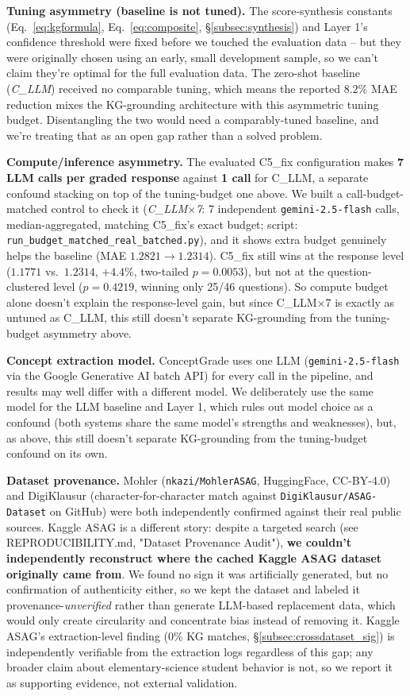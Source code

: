 \documentclass[conference]{IEEEtran}
\begin{document}
\textbf{Tuning asymmetry (baseline is not tuned).} The score-synthesis
constants (Eq.~\eqref{eq:kgformula}, Eq.~\eqref{eq:composite},
\S\ref{subsec:synthesis}) and Layer 1's confidence threshold were
fixed before we touched the evaluation data -- but they were
originally chosen using an early, small development sample, so we
can't claim they're optimal for the full evaluation data. The
zero-shot baseline (\textit{C\_LLM}) received no comparable tuning,
which means the reported $8.2\%$ MAE reduction mixes the KG-grounding
architecture with this asymmetric tuning budget. Disentangling the two
would need a comparably-tuned baseline, and we're treating that as an
open gap rather than a solved problem.

\textbf{Compute/inference asymmetry.} The evaluated C5\_fix
configuration makes \textbf{7 LLM calls per graded response} against
\textbf{1 call} for C\_LLM, a separate confound stacking on top of the
tuning-budget one above. We built a call-budget-matched control to
check it (\textit{C\_LLM$\times$7}: 7 independent
\texttt{gemini-2.5-flash} calls, median-aggregated, matching C5\_fix's
exact budget; script: \texttt{run\_budget\_matched\_real\_batched.py}),
and it shows extra budget genuinely helps the baseline (MAE
$1.2821\to1.2314$). C5\_fix still wins at the response level
($1.1771$ vs.\ $1.2314$, $+4.4\%$, two-tailed $p=0.0053$), but not at
the question-clustered level ($p=0.4219$, winning only 25/46
questions). So compute budget alone doesn't explain the response-level
gain, but since C\_LLM$\times$7 is exactly as untuned as C\_LLM, this
still doesn't separate KG-grounding from the tuning-budget asymmetry
above.

\textbf{Concept extraction model.} ConceptGrade uses one LLM
(\texttt{gemini-2.5-flash} via the Google Generative AI batch API) for
every call in the pipeline, and results may well differ with a
different model. We deliberately use the same model for the LLM
baseline and Layer 1, which rules out model choice as a confound
(both systems share the same model's strengths and weaknesses), but,
as above, this still doesn't separate KG-grounding from the
tuning-budget confound on its own.

\textbf{Dataset provenance.} Mohler (\texttt{nkazi/MohlerASAG},
HuggingFace, CC-BY-4.0) and DigiKlausur \cite{kishaan2020digiklausur}
(character-for-character match against \texttt{DigiKlausur/ASAG-Dataset}
on GitHub) were both independently confirmed against their real public
sources. Kaggle ASAG is a different story: despite a targeted search
(see REPRODUCIBILITY.md, "Dataset Provenance Audit"), \textbf{we
couldn't independently reconstruct where the cached Kaggle ASAG
dataset originally came from}. We found no sign it was artificially
generated, but no confirmation of authenticity either, so we kept
the dataset and labeled it provenance-\emph{unverified} rather than
generate LLM-based replacement data, which would only create
circularity and concentrate bias instead of removing it. Kaggle
ASAG's extraction-level finding (0\% KG matches,
\S\ref{subsec:crossdataset_sig}) is independently verifiable from the
extraction logs regardless of this gap; any broader claim about
elementary-science student behavior is not, so we report it as
supporting evidence, not external validation.
\end{document}
